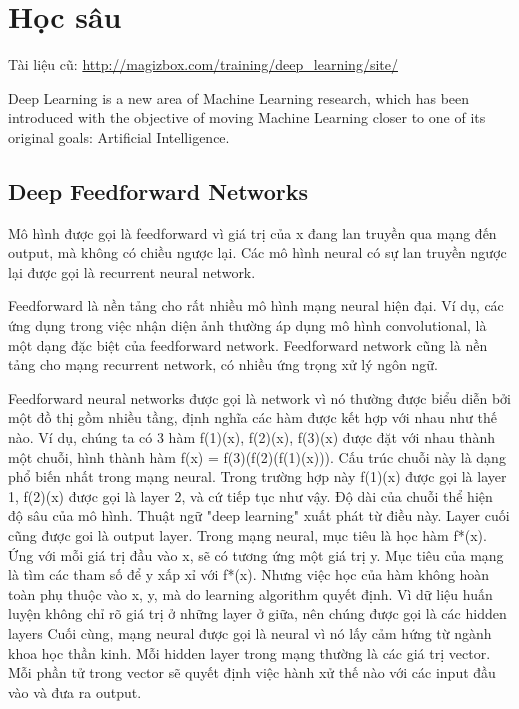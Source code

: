\chapter{Học sâu}

Tài liệu cũ: \href{http://magizbox.com/training/deep_learning/site/}{http://magizbox.com/training/deep\_learning/site/}

Deep Learning is a new area of Machine Learning research, which has been introduced with the objective of moving Machine Learning closer to one of its original goals: Artificial Intelligence.

\section{Deep Feedforward Networks}


Mô hình được gọi là feedforward vì giá trị của x đang lan truyền qua mạng đến output, mà không có chiều ngược lại. Các mô hình neural có sự lan truyền ngược lại được gọi là recurrent neural network.

Feedforward là nền tảng cho rất nhiều mô hình mạng neural hiện đại. Ví dụ, các ứng dụng trong việc nhận diện ảnh thường áp dụng mô hình convolutional, là một dạng đặc biệt của feedforward network. Feedforward network cũng là nền tảng cho mạng recurrent network, có nhiều ứng trọng xử lý ngôn ngữ.

Feedforward neural networks được gọi là network vì nó thường được biểu diễn bởi một đồ thị gồm nhiều tầng, định nghĩa các hàm được kết hợp với nhau như thế nào. Ví dụ, chúng ta có 3 hàm f(1)(x), f(2)(x), f(3)(x) được đặt với nhau thành một chuỗi, hình thành hàm f(x) = f(3)(f(2)(f(1)(x))). Cấu trúc chuỗi này là dạng phổ biến nhất trong mạng neural. Trong trường hợp này f(1)(x) được gọi là layer 1, f(2)(x) được gọi là layer 2, và cứ tiếp tục như vậy. Độ dài của chuỗi thể hiện độ sâu của mô hình. Thuật ngữ "deep learning" xuất phát từ điều này. Layer cuối cũng được goi là output layer.
Trong mạng neural, mục tiêu là học hàm f*(x). Ứng với mỗi giá trị đầu vào x, sẽ có tương ứng một giá trị y. Mục tiêu của mạng là tìm các tham số để y xấp xỉ với f*(x). Nhưng việc học của hàm không hoàn toàn phụ thuộc vào x, y, mà do learning algorithm quyết định. Vì dữ liệu huấn luyện không chỉ rõ giá trị ở những layer ở giữa, nên chúng được gọi là các hidden layers
Cuối cùng, mạng neural được gọi là neural vì nó lấy cảm hứng từ ngành khoa học thần kinh. Mỗi hidden layer trong mạng thường là các giá trị vector. Mỗi phần tử trong vector sẽ quyết định việc hành xử thế nào với các input đầu vào và đưa ra output.

